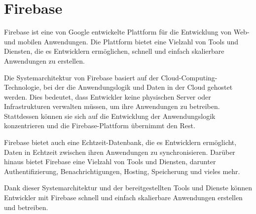 



\section{Firebase}
Firebase\cite{firebase} ist eine von Google entwickelte Plattform für die Entwicklung von Web- und mobilen Anwendungen. Die Plattform bietet eine Vielzahl von Tools und Diensten, die es Entwicklern ermöglichen, schnell und einfach skalierbare Anwendungen zu erstellen.

Die Systemarchitektur von Firebase basiert auf der Cloud-Computing-Technologie, bei der die Anwendungslogik und Daten in der Cloud gehostet werden. Dies bedeutet, dass Entwickler keine physischen Server oder Infrastrukturen verwalten müssen, um ihre Anwendungen zu betreiben. Stattdessen können sie sich auf die Entwicklung der Anwendungslogik konzentrieren und die Firebase-Plattform übernimmt den Rest.

Firebase bietet auch eine Echtzeit-Datenbank, die es Entwicklern ermöglicht, Daten in Echtzeit zwischen ihren Anwendungen zu synchronisieren. Darüber hinaus bietet Firebase eine Vielzahl von Tools und Diensten, darunter Authentifizierung, Benachrichtigungen, Hosting, Speicherung und vieles mehr.

Dank dieser Systemarchitektur und der bereitgestellten Tools und Dienste können Entwickler mit Firebase schnell und einfach skalierbare Anwendungen erstellen und betreiben.

